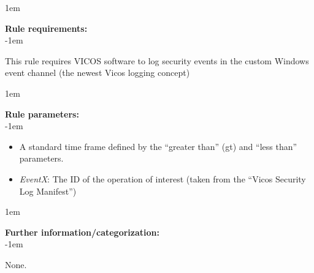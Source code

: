 \openup 1em

{\bf Rule requirements:} \\

\openup -1em
\vspace{-2em}

This rule requires VICOS software to log security events in the custom Windows event channel (the newest Vicos logging concept)

\openup 1em

{\bf Rule parameters:} \\

\openup -1em
\vspace{-2em}

\begin{itemize}
	\item A standard time frame defined by the ``greater than'' (gt) and ``less than'' parameters.
	\item \emph{EventX}: The ID of the operation of interest (taken from the ``Vicos Security Log Manifest'')
\end{itemize}

\openup 1em

{\bf Further information/categorization:} \\

\openup -1em
\vspace{-2em}


None.

\pagebreak

